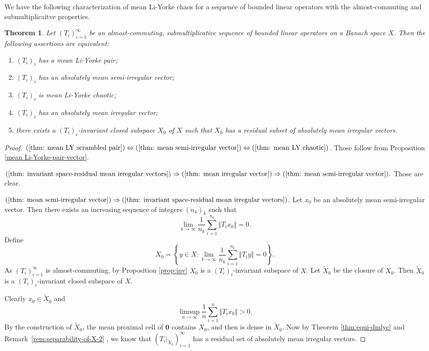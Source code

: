 \documentclass[12pt,a4paper]{amsart}
\theoremstyle{definition}
\theoremstyle{plain}
\newtheorem{thm}[defn]{Theorem}
\begin{document}
We have the following characterization of mean Li-Yorke chaos for a sequence of bounded linear operators with the almost-commuting and submultiplicaitve properties.

\begin{thm}\label{thm:euqi-lmyc}
    Let $(T_i)_{i=1}^{\infty}$ be an almost-commuting, submultiplicative sequence of bounded linear operators on a Banach space $X$.
    Then the following assertions are equivalent:
    \begin{enumerate}
        \item \label{thm: mean LY scrambled pair}
               $(T_i)_{i}$ has a  mean Li-Yorke pair;
        \item \label{thm: mean semi-irregular vector}
              $(T_i)_{i}$ has an  absolutely mean semi-irregular vector;
        \item \label{thm: mean LY chaotic}
              $(T_i)_{i}$ is mean Li-Yorke chaotic;
        \item \label{thm: mean irregular vector}
              $(T_i)_{i}$ has an  absolutely mean irregular vector;
        \item \label{thm: invariant space-residual mean irregular vectors}
              there exists a $(T_i)_{i}$-invariant closed subspace $X_0$ of $X$ such that
              $X_0$ has a residual subset of absolutely mean irregular vectors.
    \end{enumerate}
\end{thm}
\begin{proof} 
   $(\ref{thm: mean LY scrambled pair})  \Leftrightarrow (\ref{thm: mean semi-irregular vector})   \Leftrightarrow  (\ref{thm: mean LY chaotic})$. Those follow from Proposition \ref{mean Li-Yorke-pair-vector}.  
   
     $ (\ref{thm: invariant space-residual mean irregular vectors}) \Rightarrow  (\ref{thm: mean irregular vector})  \Rightarrow (\ref{thm: mean semi-irregular vector}). $ Those are clear.
     
     $(\ref{thm: mean semi-irregular vector}) \Rightarrow (\ref{thm: invariant space-residual mean irregular vectors}) $. 
     Let $x_0$ be an absolutely mean semi-irregular vector. Then there exists an increasing sequence of integers $(n_k)_k$ such that
    \[
        \lim_{k\to\infty}\frac{1}{n_k}\sum_{i=1}^{n_k}\Vert T_ix_0\Vert=0.
    \]
    Define
    \[
        X_0=\left\{y\in X\colon \lim_{k\to\infty}\frac{1}{n_k}\sum_{i=1}^{n_k}\Vert T_i y\Vert=0\right\}.
    \]
     As $(T_i)_{i=1}^\infty$ is almost-commuting, by Proposition \ref{prop:inv} $X_0$ is a $(T_i)_{i}$-invariant subspace of $X$.
    Let $\widetilde{X}_0$ be the closure of $X_0$.
    Then $\widetilde{X}_0$ is a $(T_i)_{i}$-invariant closed subspace of $X$.

    Clearly $x_0\in \widetilde{X}_0$ and 
    \[
        \limsup_{n\to\infty}\frac{1}{n}\sum_{i=1}^n\Vert T_ix_0\Vert>0.
    \]
    By the construction of $\widetilde{X}_0$, the mean proximal cell of $\mathbf{0}$ contains $X_0$, and then is dense in $\widetilde{X}_0$. Now by Theorem \ref{thm:equi-dmlyc} and Remark~\ref{rem:separability-of-X-2} , we know that $(T_i|_{\widetilde{X}_0})_{i=1}^\infty$ has a residual set of absolutely mean irregular vectors.
\end{proof}
\end{document}
